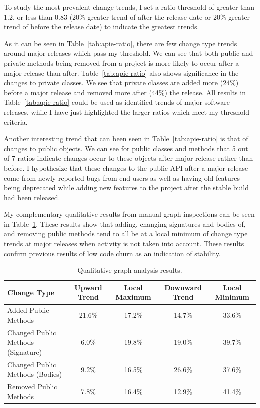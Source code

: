 To study the most prevalent change trends, I set a ratio threshold of greater than 1.2, or less than 0.83 (20\% greater trend of after the release date
or 20\% greater trend of before the release date) to indicate the greatest trends.

As it can be seen in Table~\ref{tab:apie-ratio}, there are few change type trends around major releases which pass my threshold. We can see that both public
and private methods
being removed from a project is more likely to occur after a major release than after. Table~\ref{tab:apie-ratio} also shows significance in the changes to private
classes. We see that private classes are added more (24\%) before a major release and removed more after (44\%) the release. 
All results in Table~\ref{tab:apie-ratio} could be used as identified trends of major software releases, while I have just highlighted the larger ratios
which meet my threshold criteria.

Another interesting trend that can been seen in Table~\ref{tab:apie-ratio} is that of changes to public objects. We can see for public classes and methods that
5 out of 7 ratios indicate changes occur to these objects after major release rather than before. I hypothesize that these changes to the public API
after a major release come from newly reported bugs from end users as well as having old features being deprecated while adding new features to the project
after the stable build had been released.

My complementary qualitative results from manual graph inspections can be seen in Table~\ref{tab:qual}. These results show that adding, changing signatures
and bodies of, and removing public methods tend to all be at a local minimum of change type trends at major releases when activity is not taken into
account. These results confirm previous results of low code churn as an indication of stability.

\begin{table}[ht]
\begin{center}
\begin{tabular}{| p{2cm} | c | c | c | c |}
\hline
Change Type & Upward Trend & Local Maximum & Downward Trend & Local Minimum\\
\hline
Added Public Methods & 21.6\% & 17.2\% & 14.7\% & 33.6\% \\ \hline
Changed Public Methods (Signature) & 6.0\% & 19.8\% & 19.0\% & 39.7\% \\ \hline
Changed Public Methods (Bodies) & 9.2\% & 16.5\% & 26.6\% & 37.6\% \\ \hline
Removed Public Methods & 7.8\% & 16.4\% & 12.9\% & 41.4\% \\ \hline
\end{tabular}
\end{center}
\caption{Qualitative graph analysis results. \label{tab:qual}}
\end{table}

